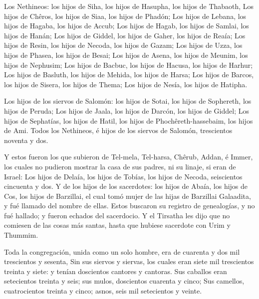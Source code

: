  Los Nethineos: los hijos de Siha, los hijos de Hasupha,
los hijos de Thabaoth,  Los hijos de Chêros, los hijos de
Siaa, los hijos de Phadón;  Los hijos de Lebana, los hijos
de Hagaba, los hijos de Accub;  Los hijos de Hagab, los
hijos de Samlai, los hijos de Hanán;  Los hijos de Giddel,
los hijos de Gaher, los hijos de Reaía;  Los hijos de
Resin, los hijos de Necoda, los hijos de Gazam;  Los hijos
de Uzza, los hijos de Phasea, los hijos de Besai;  Los
hijos de Asena, los hijos de Meunim, los hijos de Nephusim;
 Los hijos de Bacbuc, los hijos de Hacusa, los hijos de
Harhur;  Los hijos de Basluth, los hijos de Mehida, los
hijos de Harsa;  Los hijos de Barcos, los hijos de Sisera,
los hijos de Thema;  Los hijos de Nesía, los hijos de
Hatipha.

 Los hijos de los siervos de Salomón: los hijos de Sotai,
los hijos de Sophereth, los hijos de Peruda;  Los hijos de
Jaala, los hijos de Darcón, los hijos de Giddel;  Los hijos
de Sephatías, los hijos de Hatil, los hijos de Phochêreth-hassebaim, los
hijos de Ami.  Todos los Nethineos, é hijos de los siervos
de Salomón, trescientos noventa y dos.

 Y estos fueron los que subieron de Tel-mela, Tel-harsa,
Chêrub, Addan, é Immer, los cuales no pudieron mostrar la casa de sus
padres, ni su linaje, si eran de Israel:  Los hijos de
Delaía, los hijos de Tobías, los hijos de Necoda, seiscientos cincuenta
y dos.  Y de los hijos de los sacerdotes: los hijos de
Abaía, los hijos de Cos, los hijos de Barzillai, el cual tomó mujer de
las hijas de Barzillai Galaadita, y fué llamado del nombre de ellas.
 Estos buscaron su registro de genealogías, y no fué
hallado; y fueron echados del sacerdocio.  Y el Tirsatha
les dijo que no comiesen de las cosas más santas, hasta que hubiese
sacerdote con Urim y Thummim.

 Toda la congregación, unida como un solo hombre, era de
cuarenta y dos mil trescientos y sesenta,  Sin sus siervos
y siervas, los cuales eran siete mil trescientos treinta y siete: y
tenían doscientos cantores y cantoras.  Sus caballos eran
setecientos treinta y seis; sus mulos, doscientos cuarenta y cinco;
 Sus camellos, cuatrocientos treinta y cinco; asnos, seis
mil setecientos y veinte.

